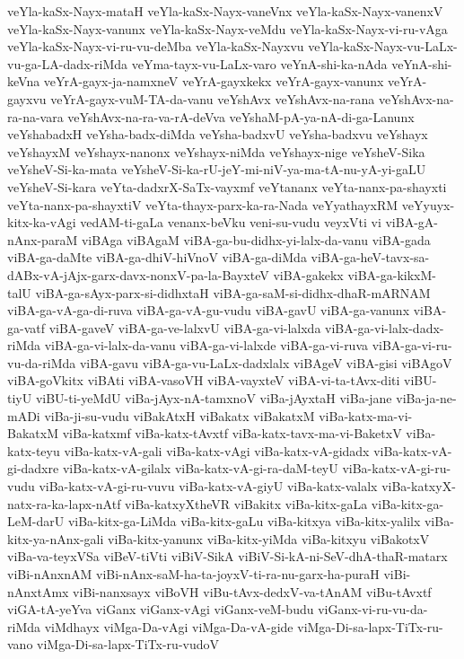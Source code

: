 {veYla-kaSx-Nayx-mataH
veYla-kaSx-Nayx-vaneVnx
veYla-kaSx-Nayx-vanenxV
veYla-kaSx-Nayx-vanunx
veYla-kaSx-Nayx-veMdu
veYla-kaSx-Nayx-vi-ru-vAga
veYla-kaSx-Nayx-vi-ru-vu-deMba
veYla-kaSx-Nayxvu
veYla-kaSx-Nayx-vu-LaLx-vu-ga-LA-dadx-riMda
veYma-tayx-vu-LaLx-varo
veYnA-shi-ka-nAda
veYnA-shi-keVna
veYrA-gayx-ja-namxneV
veYrA-gayxkekx
veYrA-gayx-vanunx
veYrA-gayxvu
veYrA-gayx-vuM-TA-da-vanu
veYshAvx
veYshAvx-na-rana
veYshAvx-na-ra-na-vara
veYshAvx-na-ra-va-rA-deVva
veYshaM-pA-ya-nA-di-ga-Lanunx
veYshabadxH
veYsha-badx-diMda
veYsha-badxvU
veYsha-badxvu
veYshayx
veYshayxM
veYshayx-nanonx
veYshayx-niMda
veYshayx-nige
veYsheV-Sika
veYsheV-Si-ka-mata
veYsheV-Si-ka-rU-jeY-mi-niV-ya-ma-tA-nu-yA-yi-gaLU
veYsheV-Si-kara
veYta-dadxrX-SaTx-vayxmf
veYtananx
veYta-nanx-pa-shayxti
veYta-nanx-pa-shayxtiV
veYta-thayx-parx-ka-ra-Nada
veYyathayxRM
veYyuyx-kitx-ka-vAgi
vedAM-ti-gaLa
venanx-beVku
veni-su-vudu
veyxVti
vi
viBA-gA-nAnx-paraM
viBAga
viBAgaM
viBA-ga-bu-didhx-yi-lalx-da-vanu
viBA-gada
viBA-ga-daMte
viBA-ga-dhiV-hiVnoV
viBA-ga-diMda
viBA-ga-heV-tavx-sa-dABx-vA-jAjx-garx-davx-nonxV-pa-la-BayxteV
viBA-gakekx
viBA-ga-kikxM-talU
viBA-ga-sAyx-parx-si-didhxtaH
viBA-ga-saM-si-didhx-dhaR-mARNAM
viBA-ga-vA-ga-di-ruva
viBA-ga-vA-gu-vudu
viBA-gavU
viBA-ga-vanunx
viBA-ga-vatf
viBA-gaveV
viBA-ga-ve-lalxvU
viBA-ga-vi-lalxda
viBA-ga-vi-lalx-dadx-riMda
viBA-ga-vi-lalx-da-vanu
viBA-ga-vi-lalxde
viBA-ga-vi-ruva
viBA-ga-vi-ru-vu-da-riMda
viBA-gavu
viBA-ga-vu-LaLx-dadxlalx
viBAgeV
viBA-gisi
viBAgoV
viBA-goVkitx
viBAti
viBA-vasoVH
viBA-vayxteV
viBA-vi-ta-tAvx-diti
viBU-tiyU
viBU-ti-yeMdU
viBa-jAyx-nA-tamxnoV
viBa-jAyxtaH
viBa-jane
viBa-ja-ne-mADi
viBa-ji-su-vudu
viBakAtxH
viBakatx
viBakatxM
viBa-katx-ma-vi-BakatxM
viBa-katxmf
viBa-katx-tAvxtf
viBa-katx-tavx-ma-vi-BaketxV
viBa-katx-teyu
viBa-katx-vA-gali
viBa-katx-vAgi
viBa-katx-vA-gidadx
viBa-katx-vA-gi-dadxre
viBa-katx-vA-gilalx
viBa-katx-vA-gi-ra-daM-teyU
viBa-katx-vA-gi-ru-vudu
viBa-katx-vA-gi-ru-vuvu
viBa-katx-vA-giyU
viBa-katx-valalx
viBa-katxyX-natx-ra-ka-lapx-nAtf
viBa-katxyXtheVR
viBakitx
viBa-kitx-gaLa
viBa-kitx-ga-LeM-darU
viBa-kitx-ga-LiMda
viBa-kitx-gaLu
viBa-kitxya
viBa-kitx-yalilx
viBa-kitx-ya-nAnx-gali
viBa-kitx-yanunx
viBa-kitx-yiMda
viBa-kitxyu
viBakotxV
viBa-va-teyxVSa
viBeV-tiVti
viBiV-SikA
viBiV-Si-kA-ni-SeV-dhA-thaR-matarx
viBi-nAnxnAM
viBi-nAnx-saM-ha-ta-joyxV-ti-ra-nu-garx-ha-puraH
viBi-nAnxtAmx
viBi-nanxsayx
viBoVH
viBu-tAvx-dedxV-va-tAnAM
viBu-tAvxtf
viGA-tA-yeYva
viGanx
viGanx-vAgi
viGanx-veM-budu
viGanx-vi-ru-vu-da-riMda
viMdhayx
viMga-Da-vAgi
viMga-Da-vA-gide
viMga-Di-sa-lapx-TiTx-ru-vano
viMga-Di-sa-lapx-TiTx-ru-vudoV
}

